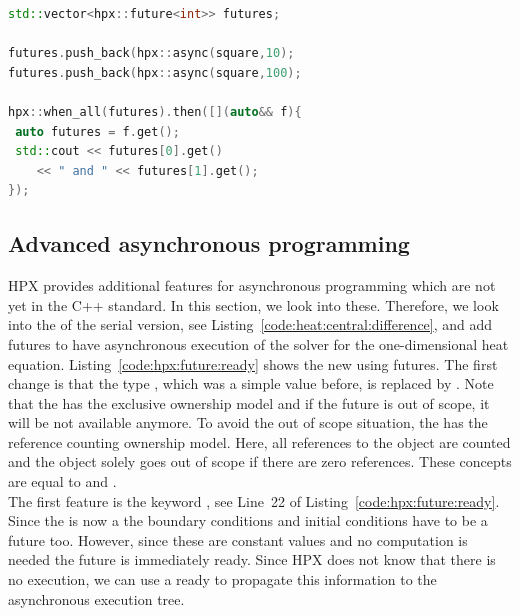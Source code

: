 \documentclass[11pt,fleqn]{book} %
\begin{document}
\begin{lstlisting}[language=c++,caption={Advanced synchronization of futures using HPX.\label{code:hpx:future:sync}},float,floatplacement=tb]
std::vector<hpx::future<int>> futures;

futures.push_back(hpx::async(square,10);
futures.push_back(hpx::async(square,100);

hpx::when_all(futures).then([](auto&& f){
 auto futures = f.get();
 std::cout << futures[0].get() 
 	<< " and " << futures[1].get();
});
\end{lstlisting}

\subsection{Advanced asynchronous programming}
\label{sec:hpx:advanced:sync}
HPX provides additional features for asynchronous programming which are not yet in the C++ standard. In this section, we look into these. Therefore, we look into the  of the serial version, see Listing~\ref{code:heat:central:difference}, and add futures to have asynchronous execution of the solver for the one-dimensional heat equation. Listing~\ref{code:hpx:future:ready} shows the new  using futures. The first change is that the type , which was a simple  value before, is replaced by . Note that the  has the exclusive ownership model and if the future is out of scope, it will be not available anymore. To avoid the out of scope situation, the  has the reference counting ownership model. Here, all references to the object are counted and the object solely goes out of scope if there are zero references. These concepts are equal to  and .\\
 
The first feature is the keyword , see Line~22 of Listing~\ref{code:hpx:future:ready}. Since the  is now a  the boundary conditions and initial conditions have to be a future too. However, since these are constant values and no computation is needed the future is immediately ready. Since HPX does not know that there is no execution, we can use a  ready to propagate this information to the asynchronous execution tree.\\
\end{document}
